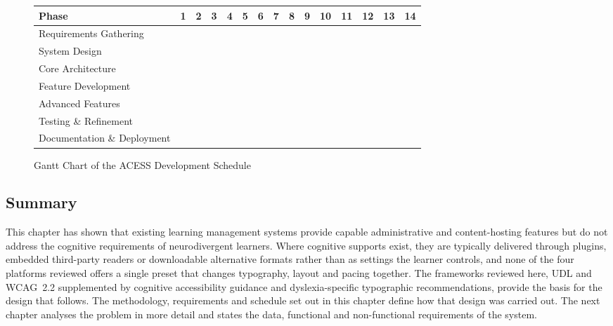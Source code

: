 \documentclass[12pt, oneside]{article} %
\newcommand{\tabbreak}{\hyphenpenalty=200\exhyphenpenalty=200\tolerance=4000\hbadness=10000\hspace{0pt}}
\begin{document}
\begin{figure}[H]
\centering
\footnotesize
\begin{tabular}{|>{\raggedright\arraybackslash\tabbreak}p{3.2cm}|*{14}{c|}}
\hline
\textbf{Phase} & \textbf{1} & \textbf{2} & \textbf{3} & \textbf{4} & \textbf{5} & \textbf{6} & \textbf{7} & \textbf{8} & \textbf{9} & \textbf{10} & \textbf{11} & \textbf{12} & \textbf{13} & \textbf{14} \\ \hline
\hline
Requirements Gathering & \cellcolor{blue!40} & \cellcolor{blue!40} & & & & & & & & & & & & \\ \hline
System Design & & \cellcolor{blue!40} & \cellcolor{blue!40} & \cellcolor{blue!40} & & & & & & & & & & \\ \hline
Core Architecture & & & & \cellcolor{green!40} & \cellcolor{green!40} & \cellcolor{green!40} & \cellcolor{green!40} & & & & & & & \\ \hline
Feature Development & & & & & & & \cellcolor{green!40} & \cellcolor{green!40} & \cellcolor{green!40} & \cellcolor{green!40} & & & & \\ \hline
Advanced Features & & & & & & & & & & \cellcolor{green!40} & \cellcolor{green!40} & \cellcolor{green!40} & & \\ \hline
Testing \& Refinement & & & & & & & & & & & & \cellcolor{orange!40} & \cellcolor{orange!40} & \\ \hline
Documentation \& Deployment & & & & & & & & & & & & & \cellcolor{orange!40} & \cellcolor{orange!40} \\ \hline
\end{tabular}
\caption{Gantt Chart of the ACESS Development Schedule}
\label{fig:gantt}
\end{figure}

\subsection{Summary}

This chapter has shown that existing learning management systems provide capable administrative and content-hosting features but do not address the cognitive requirements of neurodivergent learners. Where cognitive supports exist, they are typically delivered through plugins, embedded third-party readers or downloadable alternative formats rather than as settings the learner controls, and none of the four platforms reviewed offers a single preset that changes typography, layout and pacing together. The frameworks reviewed here, UDL and WCAG~2.2 supplemented by cognitive accessibility guidance and dyslexia-specific typographic recommendations, provide the basis for the design that follows. The methodology, requirements and schedule set out in this chapter define how that design was carried out. The next chapter analyses the problem in more detail and states the data, functional and non-functional requirements of the system.
\end{document}
